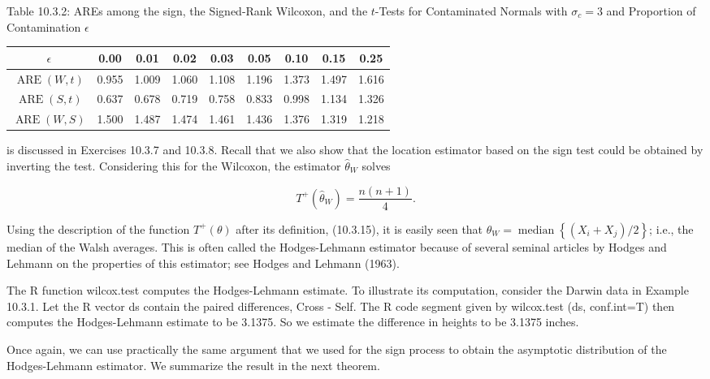 Table 10.3.2: AREs among the sign, the Signed-Rank Wilcoxon, and the $t$-Tests for Contaminated Normals with $\sigma_{c}=3$ and Proportion of Contamination $\epsilon$

\begin{center}
\begin{tabular}{|c|c|c|c|c|c|c|c|c|}
\hline
$\epsilon$ & 0.00 & 0.01 & 0.02 & 0.03 & 0.05 & 0.10 & 0.15 & 0.25 \\
\hline
$\operatorname{ARE}(W, t)$ & 0.955 & 1.009 & 1.060 & 1.108 & 1.196 & 1.373 & 1.497 & 1.616 \\
\hline
$\operatorname{ARE}(S, t)$ & 0.637 & 0.678 & 0.719 & 0.758 & 0.833 & 0.998 & 1.134 & 1.326 \\
\hline
$\operatorname{ARE}(W, S)$ & 1.500 & 1.487 & 1.474 & 1.461 & 1.436 & 1.376 & 1.319 & 1.218 \\
\hline
\end{tabular}
\end{center}

is discussed in Exercises 10.3.7 and 10.3.8. Recall that we also show that the location estimator based on the sign test could be obtained by inverting the test. Considering this for the Wilcoxon, the estimator $\widehat{\theta}_{W}$ solves


\begin{equation*}
T^{+}\left(\widehat{\theta}_{W}\right)=\frac{n(n+1)}{4} . \tag{10.3.31}
\end{equation*}


Using the description of the function $T^{+}(\theta)$ after its definition, (10.3.15), it is easily seen that $\widehat{\theta}_{W}=\operatorname{median}\left\{\left(X_{i}+X_{j}\right) / 2\right\}$; i.e., the median of the Walsh averages. This is often called the Hodges-Lehmann estimator because of several seminal articles by Hodges and Lehmann on the properties of this estimator; see Hodges and Lehmann (1963).

The R function wilcox.test computes the Hodges-Lehmann estimate. To illustrate its computation, consider the Darwin data in Example 10.3.1. Let the R vector ds contain the paired differences, Cross - Self. The R code segment given by wilcox.test (ds, conf.int=T) then computes the Hodges-Lehmann estimate to be 3.1375. So we estimate the difference in heights to be 3.1375 inches.

Once again, we can use practically the same argument that we used for the sign process to obtain the asymptotic distribution of the Hodges-Lehmann estimator. We summarize the result in the next theorem.

